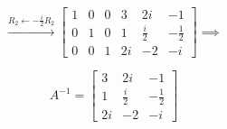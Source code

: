 \begin{answer}
    $$
    \xrightarrow{R_2\leftarrow-\frac{i}{2}R_2}
    \left[
    \begin{array}{ccc|ccc}
        1 & 0 & 0 & 3 & 2i & -1\\
        0 & 1 & 0 & 1 & \frac{i}{2} & -\frac12\\
        0 & 0 & 1 & 2i & -2 & -i
    \end{array}
    \right]
    \implies
    $$

    $$
    \boxed{
    A^{-1}=
    \begin{bmatrix}
        3 & 2i & -1\\
        1 & \frac{i}{2} & -\frac12\\
        2i & -2 & -i
    \end{bmatrix}
    }
    $$
\end{answer}
